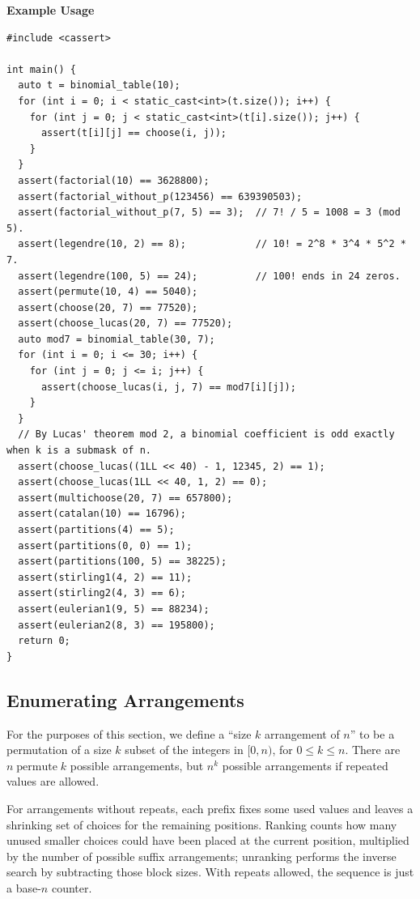 \textbf{Example Usage}\par
\begin{lstlisting}[style=cpp]
#include <cassert>

int main() {
  auto t = binomial_table(10);
  for (int i = 0; i < static_cast<int>(t.size()); i++) {
    for (int j = 0; j < static_cast<int>(t[i].size()); j++) {
      assert(t[i][j] == choose(i, j));
    }
  }
  assert(factorial(10) == 3628800);
  assert(factorial_without_p(123456) == 639390503);
  assert(factorial_without_p(7, 5) == 3);  // 7! / 5 = 1008 = 3 (mod 5).
  assert(legendre(10, 2) == 8);            // 10! = 2^8 * 3^4 * 5^2 * 7.
  assert(legendre(100, 5) == 24);          // 100! ends in 24 zeros.
  assert(permute(10, 4) == 5040);
  assert(choose(20, 7) == 77520);
  assert(choose_lucas(20, 7) == 77520);
  auto mod7 = binomial_table(30, 7);
  for (int i = 0; i <= 30; i++) {
    for (int j = 0; j <= i; j++) {
      assert(choose_lucas(i, j, 7) == mod7[i][j]);
    }
  }
  // By Lucas' theorem mod 2, a binomial coefficient is odd exactly when k is a submask of n.
  assert(choose_lucas((1LL << 40) - 1, 12345, 2) == 1);
  assert(choose_lucas(1LL << 40, 1, 2) == 0);
  assert(multichoose(20, 7) == 657800);
  assert(catalan(10) == 16796);
  assert(partitions(4) == 5);
  assert(partitions(0, 0) == 1);
  assert(partitions(100, 5) == 38225);
  assert(stirling1(4, 2) == 11);
  assert(stirling2(4, 3) == 6);
  assert(eulerian1(9, 5) == 88234);
  assert(eulerian2(8, 3) == 195800);
  return 0;
}
\end{lstlisting}
\subsection{Enumerating Arrangements}
\label{sec:6.2.2}
For the purposes of this section, we define a ``size $k$ arrangement of $n$'' to be a permutation of a size $k$ subset of the integers in $[0, n)$, for $0 \leq k \leq n$. There are $n \mathbin{\text{permute}} k$ possible arrangements, but $n^k$ possible arrangements if repeated values are allowed.

For arrangements without repeats, each prefix fixes some used values and leaves a shrinking set of choices for the remaining positions. Ranking counts how many unused smaller choices could have been placed at the current position, multiplied by the number of possible suffix arrangements; unranking performs the inverse search by subtracting those block sizes. With repeats allowed, the sequence is just a base-$n$ counter.

